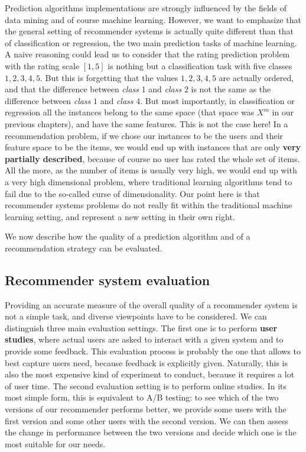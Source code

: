 Prediction algorithms implementations are strongly influenced by the fields of
data mining and of course machine learning. However, we want to emphasize that
the general setting of recommender systems is actually quite different than
that of classification or regression, the two main prediction tasks of machine
learning. A naive reasoning could lead us to consider that the rating
prediction problem with the rating scale $[1, 5]$ is nothing but a
classification task with five classes $1, 2, 3, 4, 5$. But this is forgetting
that the values $1, 2, 3, 4, 5$ are actually ordered, and that the difference
between \textit{class} $1$ and \textit{class} $2$ is not the same as the
difference between \textit{class} $1$ and \textit{class} $4$. But most
importantly, in classification or regression all the instances belong to the
same space (that space was $X^m$ in our previous chapters), and have the same
features. This is not the case here! In a recommendation problem, if we chose
our instances to be the users and their feature space to be the items, we would
end up with instances that are only \textbf{very partially described}, because of
course no user has rated the whole set of items. All the more, as the number of
items is usually very high, we would end up with a very high dimensional
problem, where traditional learning algorithms tend to fail due to the
so-called curse of dimensionality. Our point here is that recommender systems
problems do not really fit within the traditional machine learning setting, and
represent a new setting in their own right.

We now describe how the quality of a prediction algorithm and of a
recommendation strategy can be evaluated.

\subsection{Recommender system evaluation}
\label{SEC:Recommender_system_evaluation}
Providing an accurate measure of the overall quality of a recommender system is
not a simple task, and diverse viewpoints have to be considered.
We can distinguish three main evaluation settings. The first one is to perform
\textbf{user studies}, where actual users are asked to interact with a given system and to
provide some feedback. This evaluation process is probably the one that allows
to best capture users need, because feedback is explicitly given. Naturally,
this is also the most expensive kind of experiment to conduct, because it
requires a lot of user time. The second evaluation setting is to perform online
studies. In its most simple form, this is equivalent to A/B testing: to see
which of the two versions of our recommender performs better, we provide some
users with the first version and some other users with the second version. We
can then assess the change in performance between the two versions and decide
which one is the most suitable for our needs.

